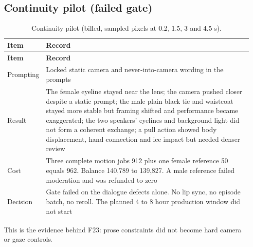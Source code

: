 \documentclass[11pt,a4paper]{article}
\begin{document}
\subsection{Continuity pilot (failed gate)}
\begin{longtable}{@{}P{4.2cm}P{11.3cm}@{}}
\caption{Continuity pilot (billed, sampled pixels at 0.2, 1.5, 3 and 4.5 s).}\\
\toprule \textbf{Item} & \textbf{Record}\\ \midrule\endfirsthead
\toprule \textbf{Item} & \textbf{Record}\\ \midrule\endhead
Prompting & Locked static camera and never-into-camera wording in the prompts\\
Result & The female eyeline stayed near the lens; the camera pushed closer despite a static prompt; the male plain black tie and waistcoat stayed more stable but framing shifted and performance became exaggerated; the two speakers' eyelines and background light did not form a coherent exchange; a pull action showed body displacement, hand connection and ice impact but needed denser review\\
Cost & Three complete motion jobs 912 plus one female reference 50 equals 962. Balance 140,789 to 139,827. A male reference failed moderation and was refunded to zero\\
Decision & Gate failed on the dialogue defects alone. No lip sync, no episode batch, no reroll. The planned 4 to 8 hour production window did not start\\
\bottomrule
\end{longtable}
This is the evidence behind F23: prose constraints did not become hard camera or gaze controls.
\end{document}
